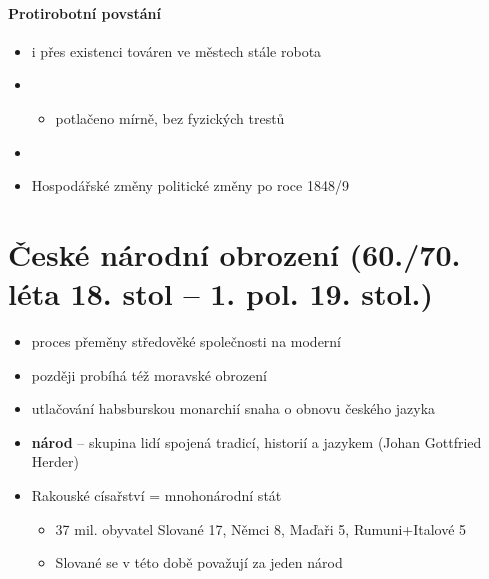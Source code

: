 \paragraph{Protirobotní povstání}
\begin{itemize}
\item i přes existenci továren ve městech stále robota
\item {}	
	\begin{itemize}
	\item potlačeno mírně, bez fyzických trestů
	\end{itemize}
\item {}
\item Hospodářské změny \ra politické změny po roce 1848/9
\end{itemize}

\section{České národní obrození (60./70. léta 18. stol -- 1. pol. 19. stol.)}
\begin{itemize}
\item proces přeměny středověké společnosti na moderní
\item později probíhá též moravské obrození
\item utlačování habsburskou monarchií \ra snaha o obnovu českého jazyka 
\item \textbf{národ} -- skupina lidí spojená tradicí, historií a jazykem (Johan Gottfried Herder)
\item Rakouské císařství = mnohonárodní stát
	\begin{itemize}
	\item 37 mil. obyvatel \ra Slované 17, Němci 8, Maďaři 5, Rumuni+Italové 5
	\item Slované se v této době považují za jeden národ
	\end{itemize}

\end{itemize}

